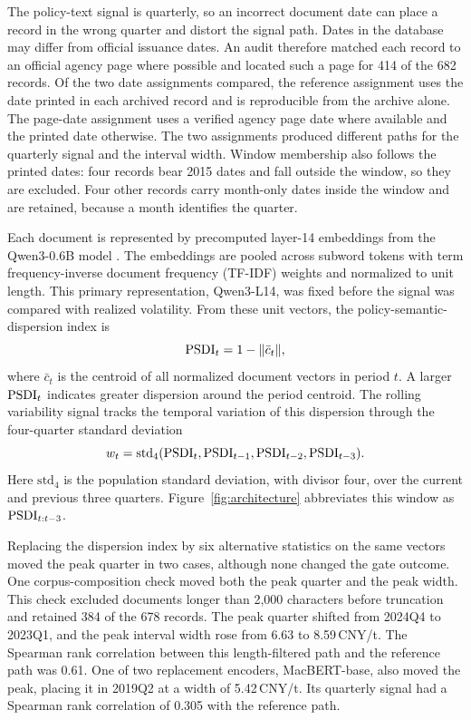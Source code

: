 The policy-text signal is quarterly, so an incorrect document date can place a record in the wrong quarter and distort the signal path. Dates in the database may differ from official issuance dates. An audit therefore matched each record to an official agency page where possible and located such a page for 414 of the 682 records. Of the two date assignments compared, the reference assignment uses the date printed in each archived record and is reproducible from the archive alone. The page-date assignment uses a verified agency page date where available and the printed date otherwise. The two assignments produced different paths for the quarterly signal and the interval width. Window membership also follows the printed dates: four records bear 2015 dates and fall outside the window, so they are excluded. Four other records carry month-only dates inside the window and are retained, because a month identifies the quarter.

Each document is represented by precomputed layer-14 embeddings from the Qwen3-0.6B model \citep{Yang2025}. The embeddings are pooled across subword tokens with term frequency-inverse document frequency (TF-IDF) weights and normalized to unit length. This primary representation, Qwen3-L14, was fixed before the signal was compared with realized volatility. From these unit vectors, the policy-semantic-dispersion index is
\begin{equation}
\mathrm{PSDI}_t=1-\lVert\bar{c}_t\rVert,
\label{eq:psdi}
\end{equation}
where $\bar{c}_t$ is the centroid of all normalized document vectors in period $t$. A larger $\mathrm{PSDI}_t$ indicates greater dispersion around the period centroid. The rolling variability signal tracks the temporal variation of this dispersion through the four-quarter standard deviation
\begin{equation}
w_t=\mathrm{std}_4(\mathrm{PSDI}_t,\mathrm{PSDI}_{t-1},\mathrm{PSDI}_{t-2},\mathrm{PSDI}_{t-3}).
\label{eq:wt}
\end{equation}
Here $\mathrm{std}_4$ is the population standard deviation, with divisor four, over the current and previous three quarters. Figure~\ref{fig:architecture} abbreviates this window as $\mathrm{PSDI}_{t:t-3}$.

Replacing the dispersion index by six alternative statistics on the same vectors moved the peak quarter in two cases, although none changed the gate outcome. One corpus-composition check moved both the peak quarter and the peak width. This check excluded documents longer than 2,000 characters before truncation and retained 384 of the 678 records. The peak quarter shifted from 2024Q4 to 2023Q1, and the peak interval width rose from 6.63 to 8.59\,CNY/t. The Spearman rank correlation between this length-filtered path and the reference path was 0.61. One of two replacement encoders, MacBERT-base, also moved the peak, placing it in 2019Q2 at a width of 5.42\,CNY/t. Its quarterly signal had a Spearman rank correlation of 0.305 with the reference path.

